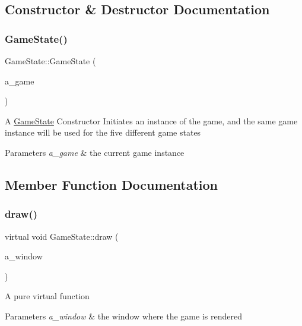 \subsection{Constructor \& Destructor Documentation}
\mbox{\label{class_game_state_a294ebc243ce5cf5f845b8548aba8e723}} 
\subsubsection{\texorpdfstring{Game\+State()}{GameState()}}
{\footnotesize\ttfamily Game\+State\+::\+Game\+State (\begin{DoxyParamCaption}\item[{\hyperlink{class_game}{Game} $\ast$}]{a\+\_\+game }\end{DoxyParamCaption})}

A \hyperlink{class_game_state}{Game\+State} Constructor Initiates an instance of the game, and the same game instance will be used for the five different game states 
\begin{DoxyParams}{Parameters}
{\em a\+\_\+game} & the current game instance \\
\hline
\end{DoxyParams}


\subsection{Member Function Documentation}
\mbox{\label{class_game_state_a5ffd5ce9acb7499ddef613e8836d1ef8}} 
\subsubsection{\texorpdfstring{draw()}{draw()}}
{\footnotesize\ttfamily virtual void Game\+State\+::draw (\begin{DoxyParamCaption}\item[{sf\+::\+Render\+Window \&}]{a\+\_\+window }\end{DoxyParamCaption})\hspace{0.3cm}{\ttfamily [pure virtual]}}

A pure virtual function


\begin{DoxyParams}{Parameters}
{\em a\+\_\+window} & the window where the game is rendered \\
\hline
\end{DoxyParams}


